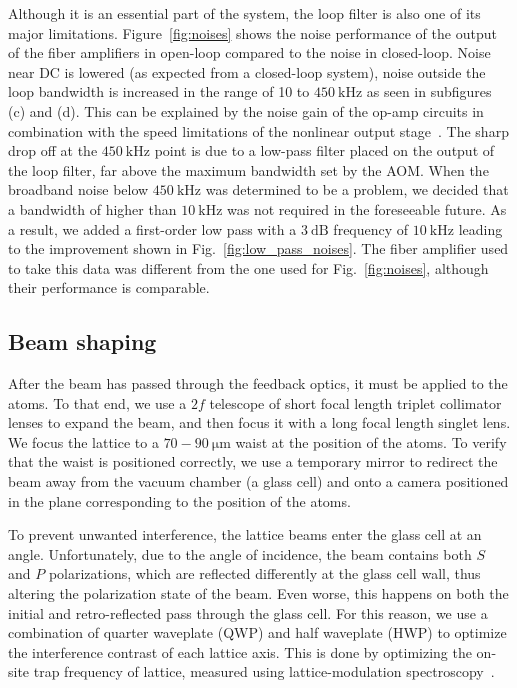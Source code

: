 \documentclass[twocolumn,aip,rsi,reprint,bibnotes]{revtex4-1}
\newcommand\unit[2]{\ensuremath{#1~\mathrm{{#2}}}}
\begin{document}
Although it is an essential part of the system, the loop filter is also one of its major limitations. Figure~\ref{fig:noises} shows the noise performance of the output of the fiber amplifiers in open-loop compared to the noise in closed-loop.
Noise near DC is lowered (as expected from a closed-loop system), noise outside the loop bandwidth is increased in the range of 10 to \unit{450}{kHz} as seen in subfigures (c) and (d).
This can be explained by the noise gain of the op-amp circuits in combination with the speed limitations of the nonlinear output stage~\cite{Horowitz2015}.
The sharp drop off at the \unit{450}{kHz} point is due to a low-pass filter placed on the output of the loop filter, far above the maximum bandwidth set by the AOM.
When the broadband noise below \unit{450}{kHz} was determined to be a problem, we decided that a bandwidth of higher than \unit{10}{kHz} was not required in the foreseeable future.
As a result, we added a first-order low pass with a \unit{3}{dB} frequency of \unit{10}{kHz} leading to the improvement shown in Fig.~\ref{fig:low_pass_noises}. The fiber amplifier used to take this data was different from the one used for Fig.~\ref{fig:noises}, although their performance is comparable.


\subsection{Beam shaping}
After the beam has passed through the feedback optics, it must be applied to the atoms. To that end, we use a $2f$ telescope of short focal length triplet collimator lenses to expand the beam, and then focus it with a long focal length singlet lens.
We focus the lattice to a \unit{70-90}{\mu{}m} waist at the position of the atoms.
To verify that the waist is positioned correctly, we use a temporary mirror to redirect the beam away from the vacuum chamber (a glass cell) and onto a camera positioned in the plane corresponding to the position of the atoms.

To prevent unwanted interference, the lattice beams enter the glass cell at an angle.
Unfortunately, due to the angle of incidence, the beam contains both $S$ and $P$ polarizations, which are reflected differently at the glass cell wall, thus altering the polarization state of the beam.
Even worse, this happens on both the initial and retro-reflected pass through the glass cell.
For this reason, we use a combination of quarter waveplate (QWP) and half waveplate (HWP) to optimize the interference contrast of each lattice axis.
This is done by optimizing the on-site trap frequency of lattice, measured using lattice-modulation spectroscopy~\cite{Blatt2015}.
\end{document}

